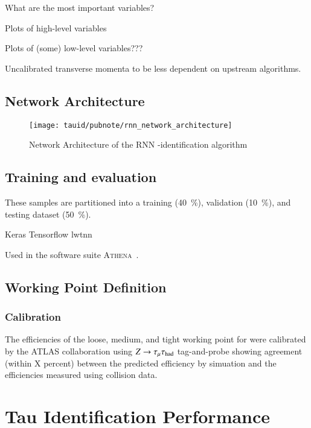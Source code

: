 What are the most important variables?

Plots of high-level variables

Plots of (some) low-level variables???

Uncalibrated transverse momenta to be less dependent on upstream
algorithms.


\subsection{Network Architecture}

\begin{figure}[htbp]
  \centering

  \texttt{[image: tauid/pubnote/rnn\_network\_architecture]}

  \caption{Network Architecture of the RNN \tauhad-identification
    algorithm \cite{ATL-PHYS-PUB-2019-033}}
  \label{fig:tauid_network_architecture}
\end{figure}

\subsection{Training and evaluation}

These samples are partitioned into a
training (\SI{40}{\percent}), validation (\SI{10}{\percent}), and
testing dataset (\SI{50}{\percent}).

Keras Tensorflow lwtnn \cite{lwtnn,keras,tensorflow2015-whitepaper,lstm}

Used in the software suite
\textsc{Athena}~\cite{ATL-SOFT-PUB-2021-001}.

\subsection{Working Point Definition}

\subsubsection{Calibration}

The efficiencies of the loose, medium, and tight working point for
\truetauhadvis were calibrated by the ATLAS collaboration using
$Z \to \tau_\mu \tau_{\text{had}}$ tag-and-probe showing agreement (within X
percent) between the predicted efficiency by simuation and the
efficiencies measured using collision data.


\section{Tau Identification Performance}
\label{sec:tauid_perf}

